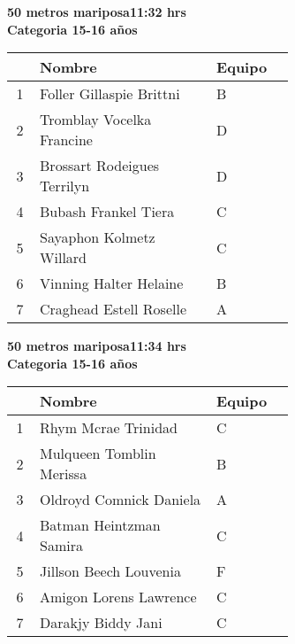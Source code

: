 \begin{minipage}{0.95\linewidth}\vspace{0.5cm} 
\begin{flushleft}
\textbf{
\hspace{-0.15cm}50 metros mariposa\hspace{1.5cm}11:32 hrs \\Categoria 15-16 años}\vspace{-0.2cm} 
\end{flushleft}
\begin{tabular}{cp{0.63\linewidth}l}
\hline
& \textbf{Nombre} & \textbf{Equipo} \\ \hline
1 & Foller Gillaspie Brittni & B \\ 
2 & Tromblay Vocelka Francine & D \\ 
3 & Brossart Rodeigues Terrilyn & D \\ 
4 & Bubash Frankel Tiera & C \\ 
5 & Sayaphon Kolmetz Willard & C \\ 
6 & Vinning Halter Helaine & B \\ 
7 & Craghead Estell Roselle & A \\ 
\end{tabular}
\end{minipage}
\begin{minipage}{0.95\linewidth}\vspace{0.5cm} 
\begin{flushleft}
\textbf{
\hspace{-0.15cm}50 metros mariposa\hspace{1.5cm}11:34 hrs \\Categoria 15-16 años}\vspace{-0.2cm} 
\end{flushleft}
\begin{tabular}{cp{0.63\linewidth}l}
\hline
& \textbf{Nombre} & \textbf{Equipo} \\ \hline
1 & Rhym Mcrae Trinidad & C \\ 
2 & Mulqueen Tomblin Merissa & B \\ 
3 & Oldroyd Comnick Daniela & A \\ 
4 & Batman Heintzman Samira & C \\ 
5 & Jillson Beech Louvenia & F \\ 
6 & Amigon Lorens Lawrence & C \\ 
7 & Darakjy Biddy Jani & C \\ 
\end{tabular}
\end{minipage}
